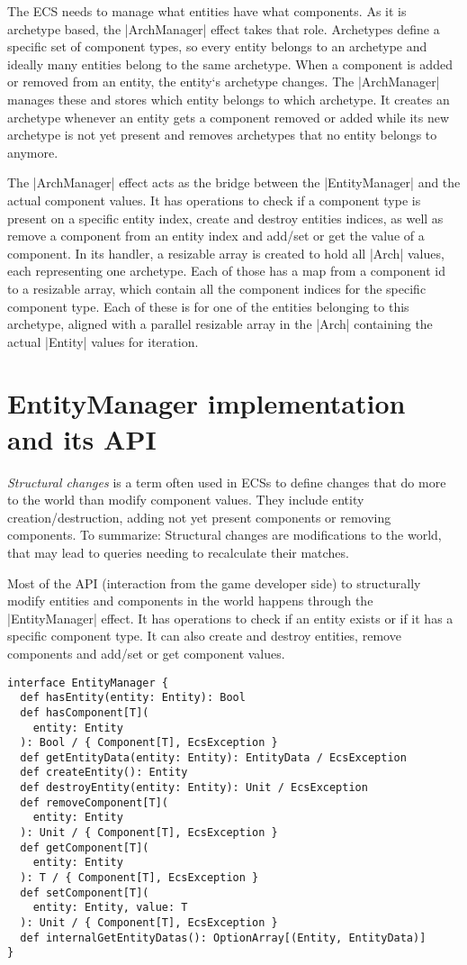 The ECS needs to manage what entities have what components. As it is archetype based, the |ArchManager| effect takes that role. Archetypes define a specific set of component types, so every entity belongs to an archetype and ideally many entities belong to the same archetype. When a component is added or removed from an entity, the entity`s archetype changes. The |ArchManager| manages these and stores which entity belongs to which archetype. It creates an archetype whenever an entity gets a component removed or added while its new archetype is not yet present and removes archetypes that no entity belongs to anymore.

The |ArchManager| effect acts as the bridge between the |EntityManager| and the actual component values. It has operations to check if a component type is present on a specific entity index, create and destroy entities indices, as well as remove a component from an entity index and add/set or get the value of a component. In its handler, a resizable array is created to hold all |Arch| values, each representing one archetype. Each of those has a map from a component id to a resizable array, which contain all the component indices for the specific component type. Each of these is for one of the entities belonging to this archetype, aligned with a parallel resizable array in the |Arch| containing the actual |Entity| values for iteration.

\section{EntityManager implementation and its API}

\textit{Structural changes} is a term often used in ECSs to define changes that do more to the world than modify component values. They include entity creation/destruction, adding not yet present components or removing components. To summarize: Structural changes are modifications to the world, that may lead to queries needing to recalculate their matches.

Most of the API (interaction from the game developer side) to structurally modify entities and components in the world happens through the |EntityManager| effect. It has operations to check if an entity exists or if it has a specific component type. It can also create and destroy entities, remove components and add/set or get component values.

\begin{lstlisting}[caption=EntityManager signiture]
interface EntityManager {
  def hasEntity(entity: Entity): Bool
  def hasComponent[T](
    entity: Entity
  ): Bool / { Component[T], EcsException }
  def getEntityData(entity: Entity): EntityData / EcsException
  def createEntity(): Entity
  def destroyEntity(entity: Entity): Unit / EcsException
  def removeComponent[T](
    entity: Entity
  ): Unit / { Component[T], EcsException }
  def getComponent[T](
    entity: Entity
  ): T / { Component[T], EcsException }
  def setComponent[T](
    entity: Entity, value: T
  ): Unit / { Component[T], EcsException }
  def internalGetEntityDatas(): OptionArray[(Entity, EntityData)]
}
\end{lstlisting}

